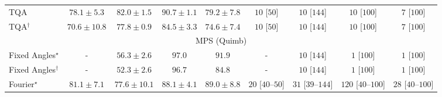 \begin{tabular}{l|cccc|cccc|}
TQA & {\cellcolor[HTML]{8C7DBA}} \color[HTML]{F1F1F1} $78.1\pm 5.3$ & {\cellcolor[HTML]{8B60AC}} \color[HTML]{F1F1F1} $82.0\pm 1.5$ & {\cellcolor[HTML]{821982}} \color[HTML]{F1F1F1} $90.7\pm 1.1$ & {\cellcolor[HTML]{8C75B6}} \color[HTML]{F1F1F1} $79.2\pm 7.8$ & {\cellcolor[HTML]{FFF6F2}} \color[HTML]{000000} $10$ [$50$] & {\cellcolor[HTML]{FFF6F2}} \color[HTML]{000000} $10$ [$144$] & {\cellcolor[HTML]{FFF6F2}} \color[HTML]{000000} $10$ [$100$] & {\cellcolor[HTML]{FFF6F2}} \color[HTML]{000000} $7$ [$100$] \\
TQA$^\dagger$ & {\cellcolor[HTML]{9AB3D5}} \color[HTML]{000000} $70.6\pm 10.8$ & {\cellcolor[HTML]{8C80BB}} \color[HTML]{F1F1F1} $77.8\pm 0.9$ & {\cellcolor[HTML]{894DA3}} \color[HTML]{F1F1F1} $84.5\pm 3.3$ & {\cellcolor[HTML]{8D98C7}} \color[HTML]{F1F1F1} $74.6\pm 7.4$ & {\cellcolor[HTML]{FFF6F2}} \color[HTML]{000000} $10$ [$50$] & {\cellcolor[HTML]{FFF6F2}} \color[HTML]{000000} $10$ [$144$] & {\cellcolor[HTML]{FFF6F2}} \color[HTML]{000000} $10$ [$100$] & {\cellcolor[HTML]{FFF6F2}} \color[HTML]{000000} $7$ [$100$] \\
\cline{1-9}
\multicolumn{9}{c}{\rule{0pt}{8pt}MPS (Quimb)} \\
\midrule
Fixed Angles$^\star$ & {\cellcolor[HTML]{000000}} \color[HTML]{F1F1F1} {\cellcolor{white}} \color{black} - & {\cellcolor[HTML]{FFF9C9}} \color[HTML]{000000} $56.3\pm 2.6$ & {\cellcolor[HTML]{692606}} \color[HTML]{F1F1F1} $97.0$ & {\cellcolor[HTML]{983404}} \color[HTML]{F1F1F1} $91.9$ & {\cellcolor[HTML]{000000}} \color[HTML]{F1F1F1} {\cellcolor{white}} \color{black} - & {\cellcolor[HTML]{FFF6F2}} \color[HTML]{000000} $10$ [$144$] & {\cellcolor[HTML]{FFF7F3}} \color[HTML]{000000} $1$ [$100$] & {\cellcolor[HTML]{FFF7F3}} \color[HTML]{000000} $1$ [$100$] \\
Fixed Angles$^\dagger$ & {\cellcolor[HTML]{000000}} \color[HTML]{F1F1F1} {\cellcolor{white}} \color{black} - & {\cellcolor[HTML]{FFFFE5}} \color[HTML]{000000} $52.3\pm 2.6$ & {\cellcolor[HTML]{6B2606}} \color[HTML]{F1F1F1} $96.7$ & {\cellcolor[HTML]{D35406}} \color[HTML]{F1F1F1} $84.8$ & {\cellcolor[HTML]{000000}} \color[HTML]{F1F1F1} {\cellcolor{white}} \color{black} - & {\cellcolor[HTML]{FFF6F2}} \color[HTML]{000000} $10$ [$144$] & {\cellcolor[HTML]{FFF7F3}} \color[HTML]{000000} $1$ [$100$] & {\cellcolor[HTML]{FFF7F3}} \color[HTML]{000000} $1$ [$100$] \\
Fourier$^\star$ & {\cellcolor[HTML]{E86C12}} \color[HTML]{F1F1F1} $81.1\pm 7.1$ & {\cellcolor[HTML]{F5851F}} \color[HTML]{F1F1F1} $77.6\pm 10.1$ & {\cellcolor[HTML]{B94303}} \color[HTML]{F1F1F1} $88.1\pm 4.1$ & {\cellcolor[HTML]{B13F03}} \color[HTML]{F1F1F1} $89.0\pm 8.8$ & {\cellcolor[HTML]{FFF3EF}} \color[HTML]{000000} $20$ [$40$--$50$] & {\cellcolor[HTML]{FEF1ED}} \color[HTML]{000000} $31$ [$39$--$144$] & {\cellcolor[HTML]{FDDAD7}} \color[HTML]{000000} $120$ [$40$--$100$] & {\cellcolor[HTML]{FEF1ED}} \color[HTML]{000000} $28$ [$40$--$100$] \\

\end{tabular}
